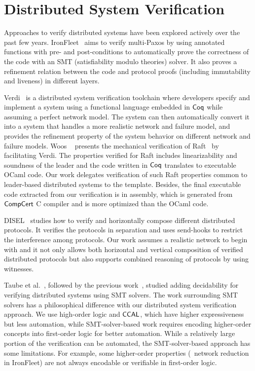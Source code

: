 \section{Distributed System Verification}
\label{chatper:related:sec:distributed-system-verification}

Approaches to verify distributed systems have been explored actively over the
past few years. 
IronFleet~\cite{ironfleet} aims to verify multi-Paxos by using annotated functions with pre- and
post-conditions to automatically prove the correctness of the code with an SMT (satisfiability
modulo theories) solver.
It also proves a refinement relation between the code and
protocol proofs (including immutability and liveness) in different layers. 

Verdi~\cite{verdi} is a distributed system verification toolchain
where developers specify and implement a system using a functional language
embedded in $\mathsf{Coq}$ while assuming a perfect network model. 
The system can then automatically convert
it into a system that handles a more realistic network and failure model,
and provides the refinement property of the system behavior on different network and failure models.
Woos \etal~ presents the mechanical verification of Raft~\cite{cppraft} by facilitating Verdi. The properties
verified for Raft includes linearizability and soundness of the leader and
the code written in $\mathsf{Coq}$ translates to executable OCaml code. 
Our work delegates verification of such Raft properties common to leader-based distributed systems to the template.
Besides, the final executable code extracted from
our verification is in assembly, which is generated from $\mathsf{CompCert}$ C compiler and is more
optimized than the OCaml code.


DISEL~\cite{disel}
studies how to verify and horizontally compose different distributed protocols.
It verifies the protocols in separation and uses send-hooks to restrict the
interference among protocols. Our work assumes a realistic network to begin with
and it not only allows both horizontal and vertical composition of verified distributed
protocols but also supports combined reasoning of protocols by using witnesses.

Taube et al.~\cite{modular}, followed by the previous work~\cite{paxosepr}, studied adding
decidability for verifying distributed systems using SMT solvers.
The work surrounding SMT solvers has a philosophical difference with our distributed system verification approach.
We use high-order logic and $\mathsf{CCAL}$, which have higher expressiveness but less automation,
while SMT-solver-based work requires encoding higher-order concepts into
first-order logic for better automation. While a relatively large portion of the
verification can be automated, the SMT-solver-based approach has some limitations.
For example, some higher-order properties (\eg~network reduction
in IronFleet) are not always encodable or verifiable in first-order logic.



